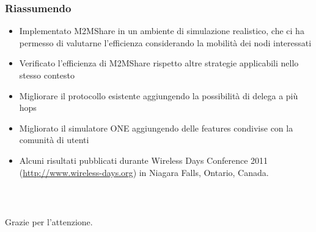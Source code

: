 \documentclass{beamer}
\begin{document}
%

\begin{frame}
\frametitle{Riassumendo}

\begin{itemize}
\item Implementato M2MShare in un ambiente di simulazione realistico, che ci ha permesso di valutarne l'efficienza considerando la mobilità dei nodi interessati
\pause
\item Verificato l'efficienza di M2MShare rispetto altre strategie applicabili nello stesso contesto
\pause
\item Migliorare il protocollo esistente aggiungendo la possibilità di delega a più hops
\pause
\item Migliorato il simulatore ONE aggiungendo delle features condivise con la comunità di utenti
\pause
\item Alcuni risultati pubblicati durante Wireless Days Conference 2011 (\href{http://www.wireless-days.org/}{http://www.wireless-days.org}) in Niagara Falls, Ontario, Canada.
\end{itemize}
\end{frame}

\begin{frame}
\frametitle{\ }
\begin{center}
Grazie per l'attenzione.
\end{center}
\end{frame}
\end{document}
